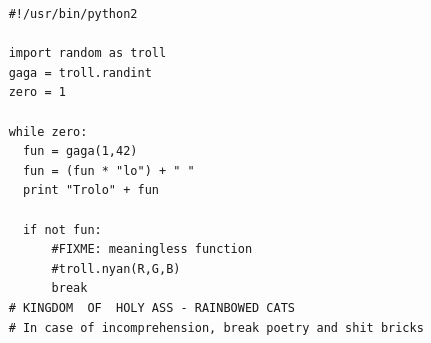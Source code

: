 


    	





  \begin{lstlisting}
    #!/usr/bin/python2

    import random as troll
    gaga = troll.randint
    zero = 1

    while zero:
	  fun = gaga(1,42)
	  fun = (fun * "lo") + " "
	  print "Trolo" + fun

	  if not fun:
		  #FIXME: meaningless function
		  #troll.nyan(R,G,B)
		  break
    # KINGDOM  OF  HOLY ASS - RAINBOWED CATS
    # In case of incomprehension, break poetry and shit bricks
  \end{lstlisting}
